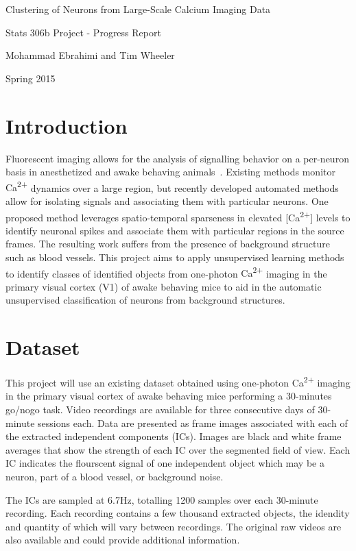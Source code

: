 \documentclass[11pt]{article}
\newcommand{\calcium}[0]{Ca\textsuperscript{2+}}
\begin{document}
\begin{center}
    {\LARGE Clustering of Neurons from Large-Scale Calcium Imaging Data}

    Stats 306b Project - Progress Report

    Mohammad Ebrahimi and Tim Wheeler

    Spring 2015
\end{center}

\section{Introduction}

Fluorescent imaging allows for the analysis of signalling behavior on a per-neuron basis in anesthetized and awake behaving animals~\cite{Mukamel2009}. 
Existing methods monitor {\calcium} dynamics over a large region, but recently developed automated methods allow for isolating signals and associating them with particular neurons.
One proposed method leverages spatio-temporal sparseness in elevated [\calcium] levels to identify neuronal spikes and associate them with particular regions in the source frames.
The resulting work suffers from the presence of background structure such as blood vessels.
This project aims to apply unsupervised learning methods to identify classes of identified objects from one-photon {\calcium} imaging in the primary visual cortex (V1) of awake behaving mice to aid in the automatic unsupervised classification of neurons from background structures.

\section{Dataset}

This project will use an existing dataset obtained using one-photon {\calcium} imaging in the primary visual cortex of awake behaving mice performing a \num{30}-minutes go/nogo task.
Video recordings are available for three consecutive days of \num{30}-minute sessions each.
Data are presented as frame images associated with each of the extracted independent components (ICs).
Images are black and white frame averages that show the strength of each IC over the segmented field of view. 
Each IC indicates the flourscent signal of one independent object which may be a neuron, part of a blood vessel, or background noise.

The ICs are sampled at \num{6.7}\si{Hz}, totalling \num{1200} samples over each \num{30}-minute recording. 
Each recording contains a few thousand extracted objects, the idendity and quantity of which will vary between recordings.
The original raw videos are also available and could provide additional information.
\end{document}
